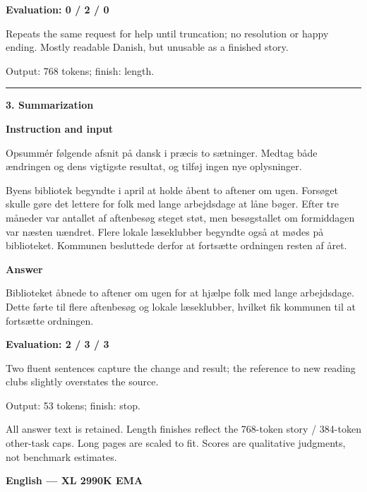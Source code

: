 \documentclass[10pt]{article}
\begin{document}
{\begin{minipage}{\textwidth}
\textbf{Evaluation: 0 / 2 / 0}\par Repeats the same request for help until truncation; no resolution or happy ending. Mostly readable Danish, but unusable as a finished story.
\par {\color{gray} Output: 768 tokens; finish: length.}\par
\medskip\hrule\smallskip
{\bfseries 3. Summarization}\par\smallskip
\textbf{Instruction and input}\par Opsummér følgende afsnit på dansk i præcis to sætninger. Medtag både ændringen og dens vigtigste resultat, og tilføj ingen nye oplysninger.
\par\smallskip
Byens bibliotek begyndte i april at holde åbent to aftener om ugen. Forsøget skulle gøre det lettere for folk med lange arbejdsdage at låne bøger. Efter tre måneder var antallet af aftenbesøg steget støt, men besøgstallet om formiddagen var næsten uændret. Flere lokale læseklubber begyndte også at mødes på biblioteket. Kommunen besluttede derfor at fortsætte ordningen resten af året.\par\smallskip
\textbf{Answer}\par Biblioteket åbnede to aftener om ugen for at hjælpe folk med lange arbejdsdage. Dette førte til flere aftenbesøg og lokale læseklubber, hvilket fik kommunen til at fortsætte ordningen.\par\smallskip
\textbf{Evaluation: 2 / 3 / 3}\par Two fluent sentences capture the change and result; the reference to new reading clubs slightly overstates the source.
\par {\color{gray} Output: 53 tokens; finish: stop.}\par
\medskip\footnotesize All answer text is retained. Length finishes reflect the 768-token story / 384-token other-task caps. Long pages are scaled to fit. Scores are qualitative judgments, not benchmark estimates.
\end{minipage}}%
\noindent\ifdim\dimexpr\ht\languagepage+\dp\languagepage\relax>0.93\textheight%
\resizebox*{!}{0.93\textheight}{\usebox{\languagepage}}%
\else\usebox{\languagepage}\fi%
\clearpage
{\Large\bfseries English --- XL 2990K EMA}\par\smallskip
\end{document}
